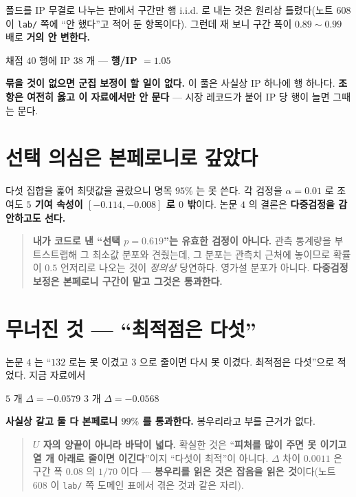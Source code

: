 \documentclass[11pt]{article}
\begin{document}
폴드를 IP 무결로 나누는 판에서 구간만 행 i.i.d. 로 내는 것은 원리상
틀렸다(노트 $608$ 이 \texttt{lab/} 쪽에 ``안 했다''고 적어 둔 항목이다).
그런데 재 보니 구간 폭이 $0.89\!\sim\!0.99$ 배로 \textbf{거의 안 변한다.}

\begin{center}
채점 $40$ 행에 IP $38$ 개 --- \textbf{행/IP $=1.05$}
\end{center}

\textbf{묶을 것이 없으면 군집 보정이 할 일이 없다.} 이 풀은 사실상
IP 하나에 행 하나다. \textbf{조항은 여전히 옳고 이 자료에서만 안 문다} ---
시장 레코드가 붙어 IP 당 행이 늘면 그때는 문다.

\section{선택 의심은 본페로니로 갚았다}

다섯 집합을 훑어 최댓값을 골랐으니 명목 $95\%$ 는 못 쓴다. 각 검정을
$\alpha{=}0.01$ 로 조여도 \textbf{$5$ 기여 속성이 $[-0.114,-0.008]$ 로
$0$ 밖}이다. 논문 $4$ 의 결론은 \textbf{다중검정을 감안하고도 선다.}

\begin{quote}
\textbf{내가 코드로 낸 ``선택 $p{=}0.619$''는 유효한 검정이 아니다.}
관측 통계량을 부트스트랩해 그 최소값 분포와 견줬는데, 그 분포는 관측치
근처에 놓이므로 확률이 $0.5$ 언저리로 나오는 것이 \emph{정의상} 당연하다.
영가설 분포가 아니다. \textbf{다중검정 보정은 본페로니 구간이 맡고 그것은
통과한다.}
\end{quote}

\section{무너진 것 --- ``최적점은 다섯''}

논문 $4$ 는 ``$132$ 로는 못 이겼고 $3$ 으로 줄이면 다시 못 이겼다.
최적점은 다섯''으로 적었다. 지금 자료에서

\begin{center}
$5$ 개 $\Delta=-0.0579$ \qquad $3$ 개 $\Delta=-0.0568$
\end{center}

\textbf{사실상 같고 둘 다 본페로니 $99\%$ 를 통과한다.} 봉우리라고 부를
근거가 없다.

\begin{quote}
\textbf{$U$ 자의 양끝이 아니라 바닥이 넓다.} 확실한 것은 ``\textbf{피처를
많이 주면 못 이기고 열 개 아래로 줄이면 이긴다}''이지 ``다섯이 최적''이
아니다. $\Delta$ 차이 $0.0011$ 은 구간 폭 $0.08$ 의 $1/70$ 이다 ---
\textbf{봉우리를 읽은 것은 잡음을 읽은 것}이다(노트 $608$ 이 \texttt{lab/}
쪽 도메인 표에서 겪은 것과 같은 자리).
\end{quote}
\end{document}
